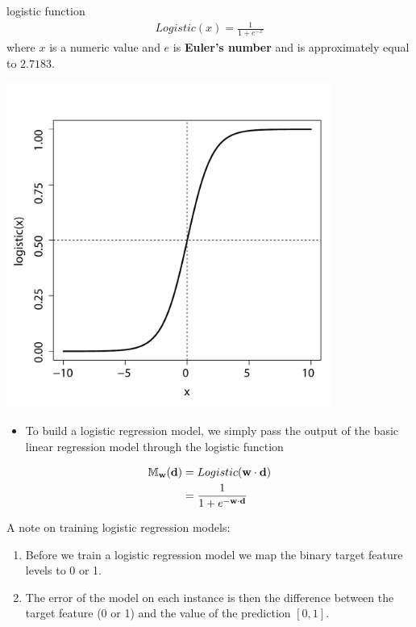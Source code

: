 \documentclass[xcolor={table}]{beamer}
\newcommand{\indexkeyword}[1]{\alert{\textbf{#1}\index{#1}}}
\begin{document}
\begin{frame} 
\begin{alertblock}{logistic function}
\begin{eqnarray}
	Logistic(x)=\frac{1}{1+e^{-x}}
	\label{eqn:logisticFunction}
\end{eqnarray}
\noindent where $x$ is a numeric value and $e$ is \indexkeyword{Euler's number} and is approximately equal to $2.7183$.  
\end{alertblock}
\end{frame} 

 \begin{frame} 
\begin{center}
\includegraphics[width=0.8\textwidth]{./images/LogisticFunction.pdf}
\end{center}
\end{frame} 

 \begin{frame} 
 \begin{itemize}
\item  To build a logistic regression model, we simply pass the output of the basic linear regression model through the logistic function 
\end{itemize}
\begin{alignat}{2}
	\mathbb{M}_{\mathbf{w}}(\mathbf{d}) & =  Logistic(\mathbf{w} \cdot \mathbf{d}) \notag \\
	& =  \frac{1}{1+e^{-\mathbf{w} \cdot \mathbf{d}}}
	\label{eqn:logisticRegression}
\end{alignat}

\begin{block}{A note on training logistic regression models:}
\begin{enumerate}
\item Before we train a logistic regression model we map the binary target feature levels to 0 or 1.
\item The error of the model on each instance is then the difference between the target feature (0 or 1) and the value of the prediction $[0,1]$.
\end{enumerate}
\end{block}
\end{frame} 
\end{document}

